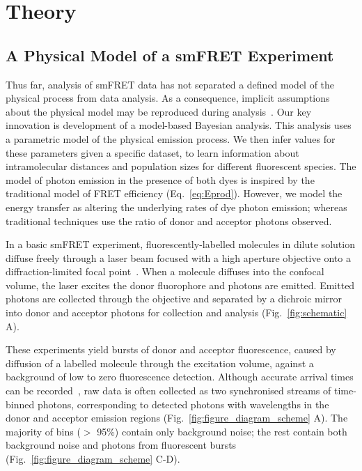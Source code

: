 \clearpage

\section{Theory}
\subsection{A Physical Model of a smFRET Experiment}
Thus far, analysis of smFRET data has not separated a defined model of the physical process from data analysis. As a consequence, implicit assumptions about the physical model may be reproduced during analysis~\cite{ying00}. Our key innovation is development of a model-based Bayesian analysis. This analysis uses a parametric model of the physical emission process. We then infer values for these parameters given a specific dataset, to learn information about intramolecular distances and population sizes for different fluorescent species. The model of photon emission in the presence of both dyes is inspired by the traditional model of FRET efficiency (Eq.~\ref{eq:Eprod}). However, we model the energy transfer as altering the underlying rates of dye photon emission; whereas traditional techniques use the ratio of donor and acceptor photons observed. 

In a basic smFRET experiment, fluorescently-labelled molecules in dilute solution diffuse freely through a laser beam focused with a high aperture objective onto a diffraction-limited focal point~\cite{schuler05}.  When a molecule diffuses into the confocal volume, the laser excites the donor fluorophore and photons are emitted.  Emitted photons are collected through the objective and separated by a dichroic mirror into donor and acceptor photons for collection and analysis (Fig.~\ref{fig:schematic} A).

These experiments yield bursts of donor and acceptor fluorescence, caused by diffusion of a labelled molecule through the excitation volume, against a background of low to zero fluorescence detection.  Although accurate arrival times can be recorded~\cite{chung09}, raw data is often collected as two synchronised streams of time-binned photons, corresponding to detected photons with wavelengths in the donor and acceptor emission regions (Fig.~\ref{fig:figure_diagram_scheme} A).  The majority of bins ($>$ 95\%) contain only background noise; the rest contain both background noise and photons from fluorescent bursts (Fig.~\ref{fig:figure_diagram_scheme} C-D).


